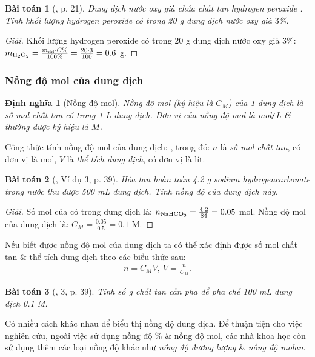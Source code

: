 \documentclass{article}
\newtheorem{baitoan}{Bài toán}
\newtheorem{dinhnghia}{Định nghĩa}
\begin{document}
\begin{baitoan}[\cite{SGK_KHTN_8_KNTTVCS}, p. 21]
	Dung dịch nước oxy già chứa chất tan hydrogen peroxide \emph{}. Tính khối lượng hydrogen peroxide có trong \emph{20 g} dung dịch nước oxy già $3$\%.
\end{baitoan}

\begin{proof}[Giải]
	Khối lượng hydrogen peroxide có trong 20 g dung dịch nước oxy già 3\%: $m_{\ce{H2O2}} = \frac{m_{\rm dd}\cdot C\%}{100\%} = \frac{20\cdot3}{100} = 0.6$ g.
\end{proof}

\subsubsection{Nồng độ mol của dung dịch}

\begin{dinhnghia}[Nồng độ mol]
	\emph{Nồng độ mol} (ký hiệu là $C_M$) của 1 dung dịch là số mol chất tan có trong \emph{1 L} dung dịch. Đơn vị của nồng độ mol là \emph{mol\texttt{/}L} \& thường được ký hiệu là $M$.
\end{dinhnghia}
Công thức tính nồng độ mol của dung dịch: , trong đó: $n$ là \textit{số mol chất tan}, có đơn vị là mol, $V$ là \textit{thể tích dung dịch}, có đơn vị là lít.

\begin{baitoan}[\cite{SGK_KHTN_8_Canh_Dieu}, Ví dụ 3, p. 39]
	Hòa tan hoàn toàn \emph{4.2 g} sodium hydrogencarbonate \emph{} trong nước thu được \emph{500 mL} dung dịch. Tính nồng độ của dung dịch này.
\end{baitoan}

\begin{proof}[Giải]
	Số mol của  có trong dung dịch là: $n_{\rm NaHCO_3} = \frac{4.2}{84} = 0.05$ mol. Nồng độ mol của dung dịch  là: $C_M = \frac{0.05}{0.5} = 0.1$ M.
\end{proof}
Nếu biết được nồng độ mol của dung dịch ta có thể xác định được số mol chất tan \& thể tích dung dịch theo các biểu thức sau:
\begin{align*}
	\boxed{n = C_MV,\ V = \frac{n}{C_M}.}
\end{align*}

\begin{baitoan}[\cite{SGK_KHTN_8_Canh_Dieu}, 3, p. 39]
	Tính số \emph{g} chất tan cần pha để pha chế \emph{100 mL} dung dịch \emph{ 0.1 M}.
\end{baitoan}
Có nhiều cách khác nhau để biểu thị nồng độ dung dịch. Để thuận tiện cho việc nghiên cứu, ngoài việc sử dụng nồng độ \% \& nồng độ mol, các nhà khoa học còn sử dụng thêm các loại nồng độ khác như \textit{nồng độ đương lượng} \& \textit{nồng độ molan}.
\end{document}
